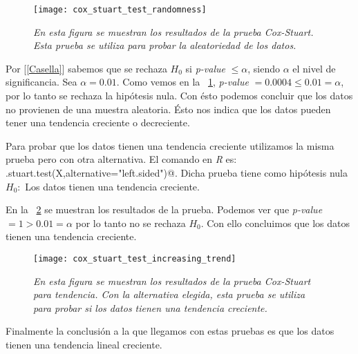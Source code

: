 \begin{figure}[H]
\centering
\texttt{[image: cox\_stuart\_test\_randomness]} %
\caption[\textit{Prueba Cox-Stuart para aleatoriedad}]{\textit{En esta figura se muestran los resultados de la prueba Cox-Stuart. Esta prueba se utiliza para probar la aleatoriedad de los datos.}}\label{coxStuartTest_randomness}
\end{figure}

%
%


Por [\ref{Casella}] sabemos que se rechaza $H_{0}$ si \textit{p-value} $ \leqslant \alpha$, siendo $\alpha$ el nivel de significancia. Sea $\alpha = 0.01$. Como vemos en la \figurename{~\ref{coxStuartTest_randomness}},  \textit{p-value} $ = 0.0004 \leqslant 0.01 = \alpha$, por lo tanto se rechaza la hipótesis nula. Con ésto podemos concluir que los datos no provienen de una muestra aleatoria. Ésto nos indica que los datos pueden tener una tendencia creciente o decreciente.

Para probar que los datos tienen una tendencia creciente utilizamos la misma prueba pero con otra alternativa. El comando en \textit{R} es: \verb@cox.stuart.test(X,alternative="left.sided")@. Dicha prueba tiene como hipótesis nula $H_{0}:$ Los datos tienen una tendencia creciente.

En la \figurename{~\ref{coxStuartTest_trend}} se muestran los resultados de la prueba. Podemos ver que \textit{p-value} $ = 1 > 0.01 = \alpha$ por lo tanto no se rechaza $H_{0}$. Con ello concluimos que los datos tienen una tendencia creciente.

\begin{figure}[H]
\centering
\texttt{[image: cox\_stuart\_test\_increasing\_trend]} %
\caption[\textit{Prueba Cox-Stuart para tendencia}]{\textit{En esta figura se muestran los resultados de la prueba Cox-Stuart para tendencia. Con la alternativa elegida, esta prueba se utiliza para probar si los datos tienen una tendencia creciente.}}\label{coxStuartTest_trend}
\end{figure}

Finalmente la conclusión a la que llegamos con estas pruebas es que los datos tienen una tendencia lineal creciente.


